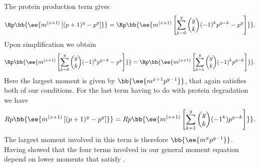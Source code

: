 The protein production term gives
\begin{equation}
  \Rp \bb{\ee{m^{(x + 1)} \left[ (p + 1)^y - p^y \right]}} =
  \Rp \bb{\ee{m^{(x + 1)} \left[ \sum_{k=0}^y {y \choose k} (-1)^k p^{y-k}
                                - p^y \right]}}.
\end{equation}
Upon simplification we obtain
\begin{equation}
  \Rp \bb{\ee{m^{(x + 1)} \left[ \sum_{k=0}^y {y \choose k} (-1)^k p^{y-k}
                                - p^y \right]}} =
  \Rp \bb{\ee{m^{(x + 1)} \left[ \sum_{k=1}^y {y \choose k}(-1)^k p^{y-k}
  \right]}}.
\end{equation}
Here the largest moment is given by $\bb{\ee{m^{x+1} p^{y-1}}}$, that again
satisfies both of our conditions. For the last term having to do with protein
degradation we have
\begin{equation}
  Rp \bb{\ee{m^{(x + 1)} \left[ (p + 1)^y - p^y \right]}} =
  Rp \bb{\ee{m^{(x + 1)} \left[ \sum_{k=1}^y {y \choose k} (-1^k) p^{y - k}
  \right]}}.
\end{equation}
The largest moment involved in this term is therefore $\bb{\ee{m^x p^{y-1}}}$.
Having showed that the four terms involved in our general moment equation depend
on lower moments that satisfy .
